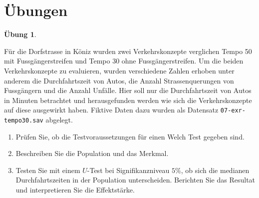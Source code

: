 \documentclass[
]{book}
\providecommand{\tightlist}{%
  \setlength{\itemsep}{0pt}\setlength{\parskip}{0pt}}
\theoremstyle{definition}
\theoremstyle{definition}
\theoremstyle{definition}
\newtheorem{exercise}{Übung}[chapter]
\theoremstyle{definition}
\theoremstyle{remark}
\begin{document}
\section{Übungen}\label{uxfcbungen-4}

\begin{exercise}
\protect\hypertarget{exr:tempo30}{}\label{exr:tempo30}\leavevmode

Für die Dorfstrasse in Köniz wurden zwei Verkehrskonzepte verglichen
Tempo 50 mit Fussgängerstreifen und Tempo 30 ohne Fussgängerstreifen. Um
die beiden Verkehrskonzepte zu evaluieren, wurden verschiedene Zahlen
erhoben unter anderem die Durchfahrtszeit von Autos, die Anzahl
Strassenquerungen von Fussgängern und die Anzahl Unfälle. Hier soll nur
die Durchfahrtszeit von Autos in Minuten betrachtet und herausgefunden
werden wie sich die Verkehrskonzepte auf diese ausgewirkt haben. Fiktive
Daten dazu wurden als Datensatz \texttt{07-exr-tempo30.sav}
abgelegt.

\begin{enumerate}
\def\labelenumi{\alph{enumi})}
\tightlist
\item
  Prüfen Sie, ob die Testvoraussetzungen für einen Welch Test gegeben
  sind.
\item
  Beschreiben Sie die Population und das Merkmal.
\item
  Testen Sie mit einem \(U\)-Test bei Signifikanzniveau \(5\%\), ob sich
  die medianen Durchfahrtszeiten in der Population unterscheiden.
  Berichten Sie das Resultat und interpretieren Sie die Effektstärke.
\end{enumerate}

\end{exercise}
\end{document}
